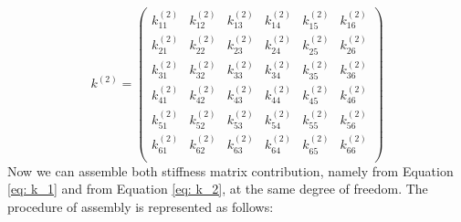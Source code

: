 \begin{equation} \label{eq: k_2}
k^{\left(2\right)} = \begin{pmatrix}
k_{11}^{\left(2\right)} & k_{12}^{\left(2\right)} &  k_{13}^{\left(2\right)} &  k_{14}^{\left(2\right)} & k_{15}^{\left(2\right)}  & k_{16}^{\left(2\right)}   \\[0.3em]
k_{21}^{\left(2\right)} & k_{22}^{\left(2\right)} &  k_{23}^{\left(2\right)} &  k_{24}^{\left(2\right)} & k_{25}^{\left(2\right)}  & k_{26}^{\left(2\right)}   \\[0.3em]
k_{31}^{\left(2\right)} & k_{32}^{\left(2\right)} &  k_{33}^{\left(2\right)} &  k_{34}^{\left(2\right)} & k_{35}^{\left(2\right)}  & k_{36}^{\left(2\right)}   \\[0.3em]
k_{41}^{\left(2\right)} & k_{42}^{\left(2\right)} &  k_{43}^{\left(2\right)} &  k_{44}^{\left(2\right)} & k_{45}^{\left(2\right)}  & k_{46}^{\left(2\right)}   \\[0.3em]
k_{51}^{\left(2\right)} & k_{52}^{\left(2\right)} &  k_{53}^{\left(2\right)} &  k_{54}^{\left(2\right)} & k_{55}^{\left(2\right)}  & k_{56}^{\left(2\right)}   \\[0.3em]
k_{61}^{\left(2\right)} & k_{62}^{\left(2\right)} &  k_{63}^{\left(2\right)} &  k_{64}^{\left(2\right)} & k_{65}^{\left(2\right)}  & k_{66}^{\left(2\right)}   \\[0.3em]
\end{pmatrix} 
\end{equation}	
Now we can assemble both stiffness matrix contribution, namely from Equation \ref{eq: k_1} and from Equation \ref{eq: k_2}, at the same degree of freedom.  The procedure of assembly is represented as follows:

